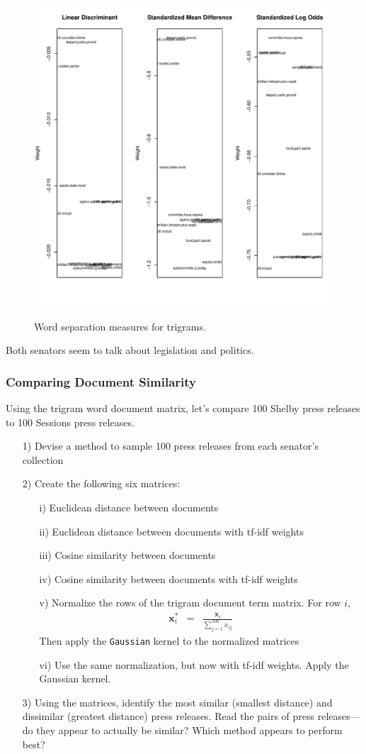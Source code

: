 \documentclass[12pt,letterpaper]{article}
\begin{document}
\begin{figure}[H]
  \caption{\footnotesize{Word separation measures for trigrams.}}
  \centering
   \includegraphics[width=.65\linewidth]{HW2wordDistanceTrigrams.pdf}\\
\end{figure}

\noindent Both senators seem to talk about legislation and politics.

\subsubsection*{Comparing Document Similarity}

Using the trigram word document matrix, let's compare 100 Shelby press releases to 100 Sessions press releases.
\begin{itemize}
\item[1)] Devise a method to sample 100 press releases from each senator's collection


\item[2)] Create the following six matrices:
\begin{itemize}
\item[i)] Euclidean distance between documents
\item[ii)] Euclidean distance between documents with tf-idf weights
\item[iii)] Cosine similarity between documents
\item[iv)] Cosine similarity between documents with tf-idf weights
\item[v)] Normalize the rows of the trigram document term matrix.  For row $i$, 
\begin{eqnarray}
\boldsymbol{x}_{i}^{*} & = & \frac{\boldsymbol{x}_{i}}{\sum_{j=1}^{500} x_{ij}} \nonumber 
\end{eqnarray}
Then apply the {\tt Gaussian} kernel to the normalized matrices
\item[vi)] Use the same normalization, but now with tf-idf weights.  Apply the Gaussian kernel.   
\end{itemize}
\item[3)] Using the matrices, identify the most similar (smallest distance) and dissimilar (greatest distance) press releases.  Read the pairs of press releases---do they appear to actually be similar?  Which method appears to perform best?
\end{itemize}
\end{document}
